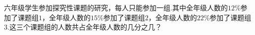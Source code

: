 六年级学生参加探究性课题的研究，每人只能参加一组.其中全年级人数的$12\%$参加了课题组$1$，全年级人数的$15\%$参加了课题组$2$，全年级人数的$22\%$参加了课题组$3$.这三个课题组的人数共占全年级人数的几分之几？